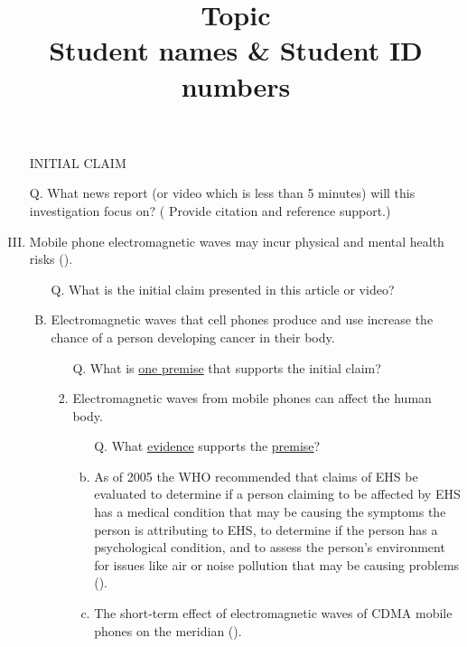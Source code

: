 \documentclass[a4paper, 12pt]{article}
\title{Topic\\
\small
Student names \& Student ID numbers
}
\date{}
\begin{document}
\begin{CJK*}{UTF8}{bsmi}
    \maketitle
    \begin{enumerate}[I.]
        \item[] {\color{blue}INITIAL CLAIM}
        \item[Q.] {What news report (or video which is less than 5 minutes) will this investigation focus on? (
              Provide citation and reference support.)}
        \item Mobile phone electromagnetic waves may incur physical and mental health risks (\cite{AIA970701}). %
              \begin{enumerate}[A.]
                  \item [Q.] What is the {\color{blue}initial claim} presented in this article or video?
                  \item Electromagnetic waves that cell phones produce and use increase the chance of a person developing
                        cancer in their body.
                        \begin{enumerate}[1.]
                            \item[Q.] What is \underline{one premise} that supports the {\color{blue}initial claim}?
                            \item Electromagnetic waves from mobile phones can affect the human body.
                                  \begin{enumerate}[a.]
                                      \item [Q.] What \underline{evidence} supports the \underline{premise}?
                                      \item As of 2005 the WHO recommended that claims of EHS be evaluated to determine if
                                            a person claiming to be affected by EHS has a medical condition that may be causing
                                            the symptoms the person is attributing to EHS, to determine if the person has a
                                            psychological condition, and to assess the person's environment for issues like air
                                            or noise pollution that may be causing problems (\cite{36069}).
                                      \item The short-term effect of electromagnetic waves of CDMA mobile phones on the meridian (\cite{R9631008}).

\end{enumerate}
\end{enumerate}
\end{enumerate}
\end{enumerate}
\end{CJK*}
\end{document}
